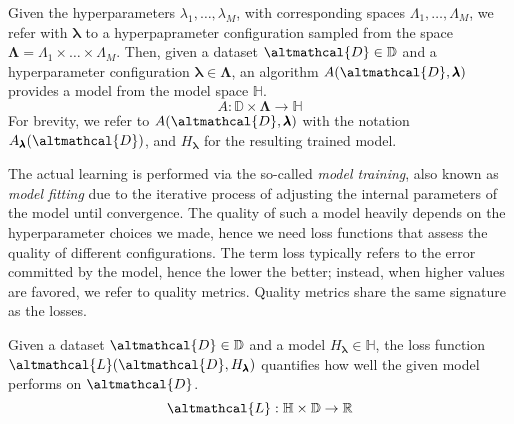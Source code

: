 \begin{definition}\label{def:algorithm}
    Given the hyperparameters $\lambda_1, \dots, \lambda_M$, with corresponding spaces $\Lambda_1, \dots, \Lambda_M$, we refer with $\pmb{\lambda}$ to a hyperpaprameter configuration sampled from the space $\pmb{\Lambda} = \Lambda_1 \times \dots \times \Lambda_M$.
    Then, given a dataset $\altmathcal{D} \in \mathbb{D}$ and a hyperparameter configuration $\pmb{\lambda} \in \pmb{\Lambda}$, an algorithm $A(\altmathcal{D}, \pmb{\lambda})$  provides a model from the model space $\mathbb{H}$.
    \begin{equation*}\label{eq:algorithm}
        A: \mathbb{D} \times \pmb{\Lambda} \rightarrow \mathbb{H}
    \end{equation*}
    For brevity, we refer to $A(\altmathcal{D}, \pmb{\lambda})$ with the notation $A_{\pmb{\lambda}}(\altmathcal{D})$, and $H_{\pmb{\lambda}}$ for the resulting trained model.
\end{definition}

The actual learning is performed via the so-called \textit{model training}, also known as \textit{model fitting} due to the iterative process of adjusting the internal parameters of the model until convergence.
The quality of such a model heavily depends on the hyperparameter choices we made, hence we need loss functions that assess the quality of different configurations.
The term loss typically refers to the error committed by the model, hence the lower the better; instead, when higher values are favored, we refer to quality metrics.
Quality metrics share the same signature as the losses.

\begin{definition}\label{def:loss}
    Given a dataset $\altmathcal{D} \in \mathbb{D}$ and a model $H_{\pmb{\lambda}} \in \mathbb{H}$, the loss function $\altmathcal{L}(\altmathcal{D}, H_{\pmb{\lambda}})$ quantifies how well the given model performs on $\altmathcal{D}$.
    \begin{equation*}\label{eq:loss}
        \altmathcal{L}: \mathbb{H} \times \mathbb{D} \rightarrow \mathbb{R}
    \end{equation*}
\end{definition}

